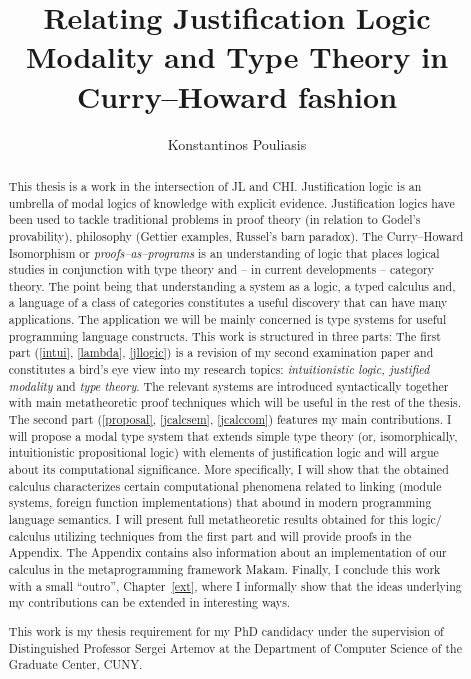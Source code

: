 \documentclass[12pt]{report}
\title{Relating Justification Logic Modality and Type Theory in Curry--Howard fashion}
\author{Konstantinos Pouliasis}
\begin{document}
\maketitle


\begin{abstract}
This thesis is a work in the intersection of \ac{JL} and \ac{CHI}. Justification logic is an umbrella of modal logics of knowledge with explicit evidence. 
Justification logics have been used to tackle traditional problems in proof theory (in relation to Godel's provability), philosophy (Gettier examples, Russel's barn paradox). 
The Curry--Howard Isomorphism or \emph{proofs--as--programs} is an understanding of logic that places logical studies in conjunction with type theory and -- in current developments -- 
category theory. The point being that  understanding a system as a logic, a typed calculus and,  a language of a class of categories constitutes a useful discovery 
that can have many applications.
The application  we will be mainly concerned  is type systems for useful programming language constructs. 
This work  is structured in three parts: 
The first part (\cref{intui}, \cref{lambda}, \cref{jllogic}) is a revision of my second examination paper and constitutes 
a bird's eye view into my 
research topics:  
\emph{intuitionistic logic, justified modality} and \emph{type theory}. 
The relevant systems are introduced syntactically together with main 
 metatheoretic proof techniques which will be useful 
in the rest of the thesis.
The second part (\cref{proposal}, \cref{jcalcsem}, \cref{jcalccom}) 
features my main contributions.
I will propose  
a modal type system that extends simple type theory
 (or, isomorphically, intuitionistic propositional logic) with elements of
 justification logic and will argue about its computational significance. 
 More specifically, I will show  
that the obtained calculus characterizes  certain 
computational phenomena related to linking (module systems, foreign function implementations) 
that abound in modern programming language semantics. 
I will present full metatheoretic
results obtained for this logic/ calculus utilizing techniques from the first part 
and will provide proofs in the Appendix. The Appendix contains also information about
an implementation of our calculus in the metaprogramming framework {\sf Makam}.
Finally, I conclude this work with a small ``outro'', Chapter~\ref{ext},
where I informally show that the ideas underlying my contributions 
can be extended in interesting ways.

This work is my thesis requirement for my PhD candidacy under the supervision of Distinguished Professor Sergei Artemov at the Department of 
Computer Science of the Graduate Center, CUNY.
\end{abstract}

\tableofcontents








\begin{appendices}

\end{appendices}




\nocite{Pfenning2009a, Pfenning2009b}




\end{document}
